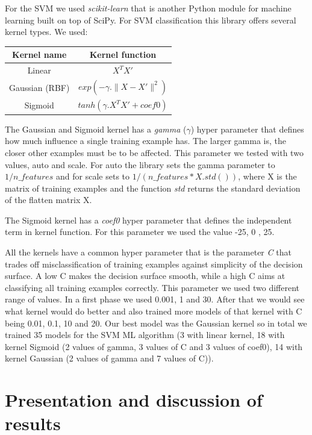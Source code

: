 \documentclass[journal, a4paper]{IEEEtran}
\begin{document}
    For the SVM we used \textit{scikit-learn} that is another Python module for machine 
learning built on top of SciPy. For SVM classification this library offers several kernel types.
We used:
    \begin{center}
      \begin{tabular}{ |c|c| }
        \hline
        \textbf{Kernel name} & \textbf{Kernel function} \\
        \hline
        Linear & \(X^{T}X'\) \\
        \hline
        Gaussian (RBF) & \( exp(-\gamma.\parallel X-X'\parallel^{2})\) \\
        \hline
        Sigmoid & \(tanh(\gamma.X^{T}X'+coef0)\) \\
        \hline
      \end{tabular}
    \end{center}
    The Gaussian and Sigmoid kernel has a \textit{gamma} (\(\gamma\)) hyper parameter that defines how 
much influence a single training example has. The larger gamma is, the closer other 
examples must be to be affected. This parameter we tested with two values, auto and scale. 
For auto the library sets the gamma parameter to \(1/n\_features\) and for scale sets to
\(1/(n\_features*X.std())\), where X is the matrix of training examples and the function 
\textit{std} returns the standard deviation of the flatten matrix X.

    The Sigmoid kernel has a \textit{coef0} hyper parameter that defines the independent 
term in kernel function. For this parameter we used the value -25, 0 , 25.

    All the kernels have a common hyper parameter that is the parameter \textit{C} that 
trades off misclassification of training examples against simplicity of the decision 
surface. A low C makes the decision surface smooth, while a high C aims at classifying 
all training examples correctly. This parameter we used two different range of values.
In a first phase we used 0.001, 1 and 30. After that we would see what kernel would do better
and also trained more models of that kernel with C being 0.01, 0.1, 10 and 20. Our best model
was the Gaussian kernel so in total we trained 35 models for the SVM ML algorithm (3 with linear
kernel, 18 with kernel Sigmoid (2 values of gamma, 3 values of C and 3 values of coef0), 14 with kernel
Gaussian (2 values of gamma and 7 values of C)).

\section{Presentation and discussion of results}
\end{document}
